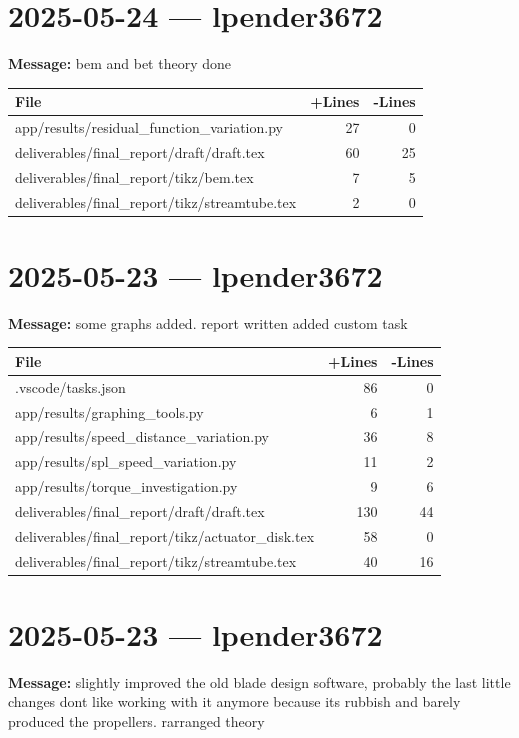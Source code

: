 \documentclass{article}
\begin{document}
\section*{2025-05-24 --- lpender3672}
\textbf{Message:} bem and bet theory done

\begin{longtable}{|p{10cm}|r|r|}
\hline \textbf{File} & \textbf{+Lines} & \textbf{-Lines} \\
\hline
app/results/residual\_function\_variation.py & 27 & 0 \\
\hline
deliverables/final\_report/draft/draft.tex & 60 & 25 \\
\hline
deliverables/final\_report/tikz/bem.tex & 7 & 5 \\
\hline
deliverables/final\_report/tikz/streamtube.tex & 2 & 0 \\
\hline
\end{longtable}

\section*{2025-05-23 --- lpender3672}
\textbf{Message:} some graphs added. report written added custom task

\begin{longtable}{|p{10cm}|r|r|}
\hline \textbf{File} & \textbf{+Lines} & \textbf{-Lines} \\
\hline
.vscode/tasks.json & 86 & 0 \\
\hline
app/results/graphing\_tools.py & 6 & 1 \\
\hline
app/results/speed\_distance\_variation.py & 36 & 8 \\
\hline
app/results/spl\_speed\_variation.py & 11 & 2 \\
\hline
app/results/torque\_investigation.py & 9 & 6 \\
\hline
deliverables/final\_report/draft/draft.tex & 130 & 44 \\
\hline
deliverables/final\_report/tikz/actuator\_disk.tex & 58 & 0 \\
\hline
deliverables/final\_report/tikz/streamtube.tex & 40 & 16 \\
\hline
\end{longtable}

\section*{2025-05-23 --- lpender3672}
\textbf{Message:} slightly improved the old blade design software, probably the last little changes dont like working with it anymore because its rubbish and barely produced the propellers. rarranged theory
\end{document}
